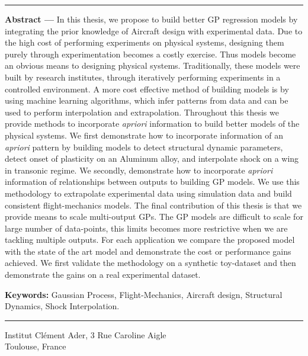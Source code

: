 \begin{vcenterpage}
\vspace{0.5cm}

\noindent\rule[2pt]{\textwidth}{0.5pt}
{\large\textbf{Abstract ---}}
    In this thesis, we propose to build better GP regression models by integrating the prior knowledge of Aircraft design with experimental data. Due to the high cost of performing experiments on physical systems, designing them purely through experimentation becomes a costly exercise. Thus models become an obvious means to designing physical systems. Traditionally, these models were built by research institutes, through iteratively performing experiments in a controlled environment. A more cost effective method of building models is by using machine learning algorithms, which infer patterns from data and can be used to perform interpolation and extrapolation. Throughout this thesis we provide methods to incorporate \textit{apriori} information to build better models of the physical systems. We first demonstrate how to incorporate information of an \textit{apriori} pattern by building models to detect structural dynamic parameters, detect onset of plasticity on an Aluminum alloy, and interpolate shock on a wing in transonic regime. We secondly, demonstrate how to incorporate \textit{apriori} information of relationships between outputs to building GP models. We use this methodology to extrapolate experimental data using simulation data and build consistent flight-mechanics models. The final contribution of this thesis is that we provide means to scale multi-output GPs. The GP models are difficult to scale for large number of data-points, this limits becomes more restrictive when we are tackling multiple outputs. 
    For each application we compare the proposed model with the state of the art model and demonstrate the cost or performance gains achieved. We first validate the methodology on a synthetic toy-dataset and then demonstrate the gains on a real experimental dataset. 

{\large\textbf{Keywords:}}
    Gaussian Process, Flight-Mechanics, Aircraft design, Structural Dynamics, Shock Interpolation.
\\
\noindent\rule[2pt]{\textwidth}{0.5pt}
\begin{center}
  Institut Cl\'ement Ader, 3 Rue Caroline Aigle\\
  Toulouse, France
\end{center}
\end{vcenterpage}

